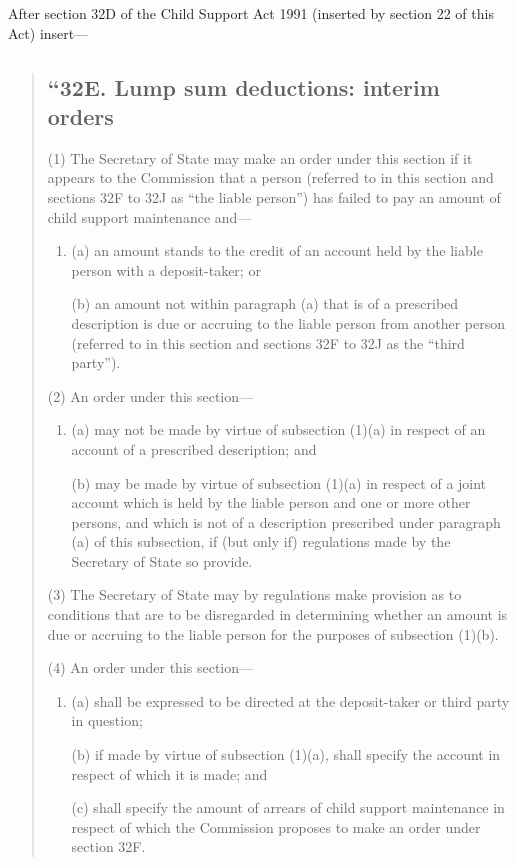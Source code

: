 \documentclass[a4paper]{article}
\begin{document}
After section 32D of the Child Support Act 1991 (inserted by section 22 of this Act) insert---
\begin{quotation}
\subsection*{``32E. Lump sum deductions: interim orders}

(1) The Secretary of State may make an order under this section if it appears to the Commission that a person (referred to in this section and sections 32F to 32J as “the liable person”) has failed to pay an amount of child support maintenance and---
\begin{enumerate}\item[]
(a) an amount stands to the credit of an account held by the liable person with a deposit-taker; or

(b) an amount not within paragraph (a) that is of a prescribed description is due or accruing to the liable person from another person (referred to in this section and sections 32F to 32J as the “third party”).
\end{enumerate}

(2) An order under this section---
\begin{enumerate}\item[]
(a) may not be made by virtue of subsection (1)(a) in respect of an account of a prescribed description; and

(b) may be made by virtue of subsection (1)(a) in respect of a joint account which is held by the liable person and one or more other persons, and which is not of a description prescribed under paragraph (a) of this subsection, if (but only if) regulations made by the Secretary of State so provide.
\end{enumerate}

(3)
The Secretary of State may by regulations make provision as to conditions that are to be disregarded in determining whether an amount is due or accruing to the liable person for the purposes of subsection (1)(b).

(4)
An order under this section---
\begin{enumerate}\item[]
(a) shall be expressed to be directed at the deposit-taker or third party in question;

(b) if made by virtue of subsection (1)(a), shall specify the account in respect of which it is made; and

(c) shall specify the amount of arrears of child support maintenance in respect of which the Commission proposes to make an order under section 32F.
\end{enumerate}


\end{quotation}
\end{document}
